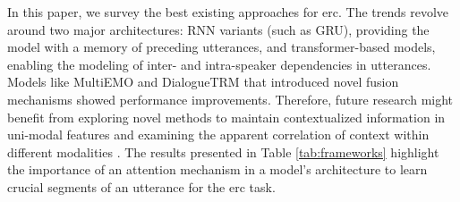 In this paper, we survey the best existing approaches for \ac{erc}. The trends revolve around two major architectures: RNN variants (such as GRU), providing the model with a memory of preceding utterances, and transformer-based models, enabling the modeling of inter- and intra-speaker dependencies in utterances. Models like MultiEMO \cite{multiemo} and DialogueTRM \cite{dialoguetrm} that introduced novel fusion mechanisms showed performance improvements. Therefore, future research might benefit from exploring novel methods to maintain contextualized information in uni-modal features and examining the apparent correlation of context within different modalities \cite{multiemo}. The results presented in Table \ref{tab:frameworks} highlight the importance of an attention mechanism in a model's architecture to learn crucial segments of an utterance for the \ac{erc} task.